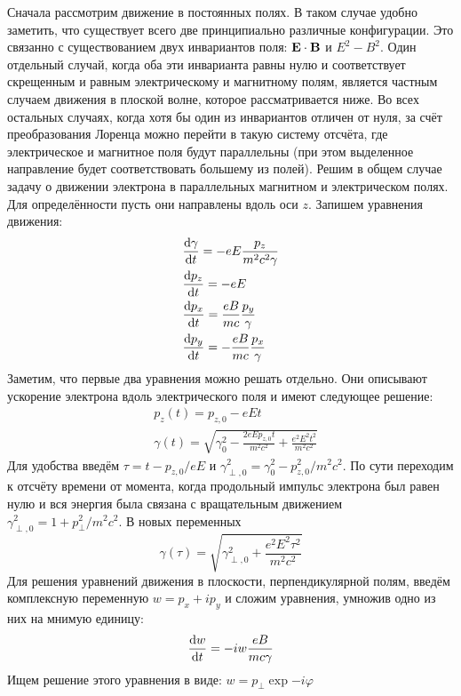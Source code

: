 \documentclass[10pt, a4paper]{article}
\begin{document}
Сначала рассмотрим движение в постоянных полях. В таком случае удобно заметить, что существует всего две принципиально различные конфигурации. Это связанно с существованием двух инвариантов поля: $\vb{E}\cdot\vb{B}$ и $E^2 - B^2$. Один отдельный случай, когда оба эти инварианта равны нулю и соответствует скрещенным и равным электрическому и магнитному полям, является частным случаем движения в плоской волне, которое рассматривается ниже. Во всех остальных случаях, когда хотя бы один из инвариантов отличен от нуля, за счёт преобразования Лоренца можно перейти в такую систему отсчёта, где электрическое и магнитное поля будут параллельны (при этом выделенное направление будет соответствовать большему из полей). Решим в общем случае задачу о движении электрона в параллельных магнитном и электрическом полях. Для определённости пусть они направлены вдоль оси $z$. Запишем уравнения движения:
\begin{align*}
	& \dv{\gamma}{t} = -eE\frac{p_z}{m^2c^2\gamma} \\
	& \dv{p_z}{t} = -eE \\
	& \dv{p_x}{t} = \frac{eB}{mc}\frac{p_y}{\gamma} \\
	& \dv{p_y}{t} = -\frac{eB}{mc}\frac{p_x}{\gamma} \\
\end{align*}
Заметим, что первые два уравнения можно решать отдельно. Они описывают ускорение электрона вдоль электрического поля и имеют следующее решение:
\begin{align*}
	& p_z(t) = p_{z,0} - eEt \\
	& \gamma(t) = \sqrt{\gamma_0^2 - \frac{2eEp_{z,0}t}{m^2c^2} + \frac{e^2E^2t^2}{m^2c^2} }
\end{align*}
Для удобства введём $\tau = t - p_{z,0}/eE$ и $\gamma_{\perp,0}^2 = \gamma_0^2 - p_{z,0}^2/m^2c^2$. По сути переходим к отсчёту времени от момента, когда продольный импульс электрона был равен нулю и вся энергия была связана с вращательным движением $\gamma_{\perp,0}^2 = 1 + p_{\perp}^2/m^2c^2$. В новых переменных
\begin{equation*}
	\gamma(\tau) = \sqrt{\gamma_{\perp, 0}^2 + \frac{e^2E^2\tau^2}{m^2c^2} }
\end{equation*}
Для решения уравнений движения в плоскости, перпендикулярной полям, введём комплексную переменную $w = p_x + i p_y$ и сложим уравнения, умножив одно из них на мнимую единицу:
\begin{equation*}
	\dv{w}{t} = -i w \frac{eB}{mc\gamma}
\end{equation*}
Ищем решение этого уравнения в виде: $w = p_\perp\exp{-i\varphi}$
\end{document}
